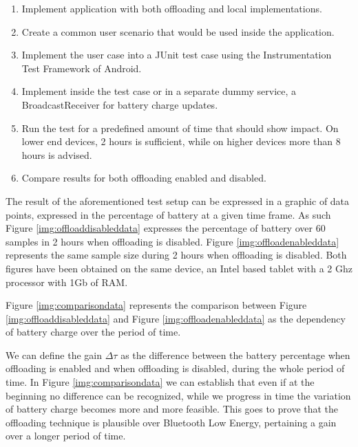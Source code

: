 \begin{enumerate}
\item{Implement application with both offloading and local implementations.}

\item{Create a common user scenario that would be used inside the application.}

\item{Implement the user case into a JUnit test case using the Instrumentation Test Framework of Android.}

\item{Implement inside the test case or in a separate dummy service, a BroadcastReceiver for battery charge updates.}

\item{Run the test for a predefined amount of time that should show impact. On lower end devices, 2 hours is sufficient, while on higher devices more than 8 hours is advised.}

\item{Compare results for both offloading enabled and disabled.}
\end{enumerate}

The result of the aforementioned test setup can be expressed in a graphic of data points, expressed in the percentage of battery at a given time frame. As such Figure \ref{img:offloaddisableddata} expresses the percentage of battery over 60 samples in 2 hours when offloading is disabled. Figure \ref{img:offloadenableddata} represents the same sample size during 2 hours when offloading is disabled. Both figures have been obtained on the same device, an Intel based tablet with a 2 Ghz processor with 1Gb of RAM.



Figure \ref{img:comparisondata} represents the comparison between Figure \ref{img:offloaddisableddata} and Figure \ref{img:offloadenableddata} as the dependency of battery charge over the period of time.


We can define the gain \(\Delta\tau\) as the difference between the battery percentage when offloading is enabled and when offloading is disabled, during the whole period of time. In Figure \ref{img:comparisondata} we can establish that even if at the beginning no difference can be recognized, while we progress in time the variation of battery charge becomes more and more feasible. This goes to prove that the offloading technique is plausible over Bluetooth Low Energy, pertaining a gain over a longer period of time.

